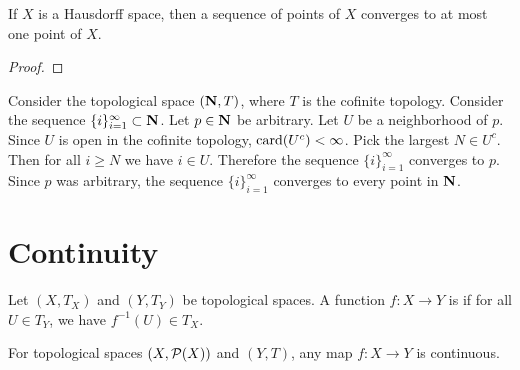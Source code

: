 \begin{theorem}
    If $X$ is a Hausdorff space, then a sequence of points of $X$ converges to at most one point of $X$.
\end{theorem}
    {\color{red} \begin{proof}
        
    \end{proof}}

\begin{example}
    Consider the topological space $(\mathbf{N},T)$, where $T$ is the cofinite topology. Consider the sequence $\{i\}_{i = 1}^\infty \subset \mathbf{N}$. Let $p \in \mathbf{N}$ be arbitrary. Let $U$ be a neighborhood of $p$. Since $U$ is open in the cofinite topology, $\operatorname{card}(U^c) < \infty$. Pick the largest $N \in U^c$. Then for all $i \geq N$ we have $i \in U$. Therefore the sequence $\{i\}_{i = 1}^\infty$ converges to $p$. Since $p$ was arbitrary, the sequence $\{i\}_{i = 1}^\infty$ converges to every point in $\mathbf{N}$.
\end{example}

\section{Continuity}

\begin{definition}
    Let $(X,T_X)$ and $(Y,T_Y)$ be topological spaces. A function $f:X \rightarrow Y$ is  if for all $U \in T_Y$, we have $f^{-1}(U) \in T_X$.
\end{definition}

\begin{example}
    For topological spaces $(X,\mathcal{P}(X))$ and $(Y,T)$, any map $f:X \rightarrow Y$ is continuous.
\end{example}

